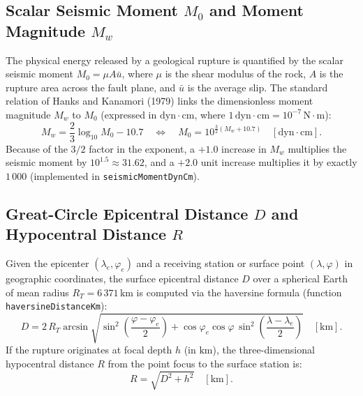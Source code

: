 \documentclass[11pt,a4paper]{article}
\newcommand{\unit}[1]{\mathrm{#1}}
\begin{document}
\subsection{Scalar Seismic Moment \texorpdfstring{$M_0$}{M0} and Moment Magnitude \texorpdfstring{$M_w$}{Mw}}
\label{sec:sismo-momento}

The physical energy released by a geological rupture is quantified by the scalar seismic moment
$M_0 = \mu A \bar{u}$, where $\mu$ is the shear modulus of the rock, $A$ is the rupture area across the fault
plane, and $\bar{u}$ is the average slip. The standard relation of Hanks and Kanamori (1979) links the
dimensionless moment magnitude $M_w$ to $M_0$ (expressed in $\unit{dyn\cdot cm}$, where
$1\,\unit{dyn\cdot cm} = 10^{-7}\,\unit{N\cdot m}$):
\begin{equation}
  M_w = \frac{2}{3}\log_{10} M_0 - 10.7
  \quad\Longleftrightarrow\quad
  M_0 = 10^{\frac{3}{2}(M_w + 10.7)}\quad[\unit{dyn\cdot cm}].
  \label{eq:momento-sismico}
\end{equation}
Because of the $3/2$ factor in the exponent, a $+1.0$ increase in $M_w$ multiplies the seismic moment by
$10^{1.5}\approx 31.62$, and a $+2.0$ unit increase multiplies it by exactly $1\,000$
(implemented in \texttt{seismicMomentDynCm}).

\subsection{Great-Circle Epicentral Distance \texorpdfstring{$D$}{D} and Hypocentral Distance \texorpdfstring{$R$}{R}}
\label{sec:sismo-distancias}

Given the epicenter $(\lambda_e,\varphi_e)$ and a receiving station or surface point $(\lambda,\varphi)$ in
geographic coordinates, the surface epicentral distance $D$ over a spherical Earth of mean radius
$R_T = 6\,371\,\unit{km}$ is computed via the haversine formula (function \texttt{haversineDistanceKm}):
\begin{equation}
  D = 2\,R_T\arcsin\sqrt{
    \sin^2\!\left(\frac{\varphi - \varphi_e}{2}\right)
    + \cos\varphi_e\cos\varphi\,\sin^2\!\left(\frac{\lambda - \lambda_e}{2}\right)
  }\quad[\unit{km}].
  \label{eq:sismo-haversine}
\end{equation}
If the rupture originates at focal depth $h$ (in $\unit{km}$), the three-dimensional hypocentral distance $R$
from the point focus to the surface station is:
\begin{equation}
  R = \sqrt{D^2 + h^2}\quad[\unit{km}].
  \label{eq:sismo-hipocentral}
\end{equation}
\end{document}
